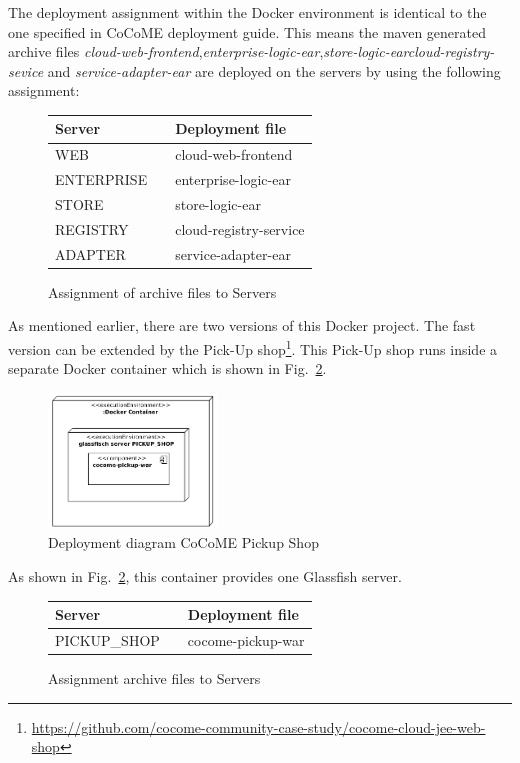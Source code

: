  	\noindent
 	The deployment assignment within the Docker environment is identical to the one specified in CoCoME deployment guide.
 	This means the maven generated archive files \textit{cloud-web-frontend},\textit{enterprise-logic-ear},\textit{store-logic-ear}\textit{cloud-registry-sevice} and \textit{service-adapter-ear} are deployed on the servers by using the following assignment:
 	\begin{figure}[H]
 		\centering
 		\begin{tabular}{l| l l}%
 			Server && Deployment file \\
 			\hline
 			WEB && cloud-web-frontend  \\
 			ENTERPRISE && enterprise-logic-ear  \\
 			STORE && store-logic-ear  \\
 			REGISTRY && cloud-registry-service  \\
 			ADAPTER && service-adapter-ear \\	
 		\end{tabular}
 		\caption{Assignment of archive files to Servers}
 		\label{table_assignment}
 	\end{figure}
 \noindent
    As mentioned earlier, there are two versions of this Docker project.
 	 The fast version can be extended by the Pick-Up shop\footnote{\url{https://github.com/cocome-community-case-study/cocome-cloud-jee-web-shop}}. This Pick-Up shop runs inside a separate Docker container which is shown in Fig.~\ref{Deploym_Pickup}.  
 	\begin{figure}[h]
 		\centering
 		\includegraphics[width = 0.4\textwidth]{img/docker_Container_PickUP.png}
 		\caption{Deployment diagram CoCoME Pickup Shop}
 		\label{Deploym_Pickup}
 	\end{figure}
 	As shown in Fig.~\ref{Deploym_Pickup}, this container provides one Glassfish server.
 	\begin{figure}[H]
 		\centering
 		\begin{tabular}{l|l l}%
 			Server && Deployment file \\
 			\hline
 			PICKUP\_SHOP && cocome-pickup-war \\	
 		\end{tabular}
 		\caption{Assignment archive files to Servers}
 		\label{table_assignment_pickup}
 	\end{figure}
